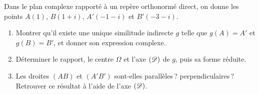 \begin{exo}\label{exo:sim-indirecte-deux-points}
      Dans le plan complexe rapporté à un repère orthonormé direct, on donne les points
      $A(1)$, $B(1 + i)$, $A'(-1 - i)$ et $B'(-3 - i)$.
      \begin{enumerate}
            \item Montrer qu'il existe une unique similitude indirecte $g$ telle que $g(A) = A'$ et $g(B) = B'$,
                  et donner son expression complexe.
            \item Déterminer le rapport, le centre $\Omega$ et l'axe $(\mathscr{D})$ de $g$, puis sa forme réduite.
            \item Les droites $(AB)$ et $(A'B')$ sont-elles parallèles\,? perpendiculaires\,? Retrouver ce résultat à l'aide de l'axe $(\mathscr{D})$.
      \end{enumerate}
\end{exo}
